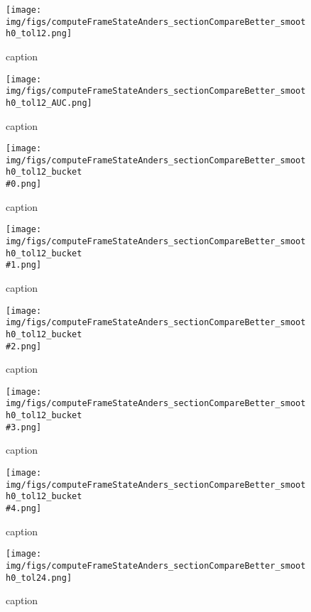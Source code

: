 %
\begin{figure}[!ht]
	\centering
	\texttt{[image: img/figs/computeFrameStateAnders\_sectionCompareBetter\_smooth0\_tol12.png]}
	\caption{caption}
	\label{fig:computeFrameStateAnders_sectionCompareBetter_smooth0_tol12.png}
\end{figure}
%
\begin{figure}[!ht]
	\centering
	\texttt{[image: img/figs/computeFrameStateAnders\_sectionCompareBetter\_smooth0\_tol12\_AUC.png]}
	\caption{caption}
	\label{fig:computeFrameStateAnders_sectionCompareBetter_smooth0_tol12_AUC.png}
\end{figure}
%
\begin{figure}[!ht]
	\centering
	\texttt{[image: img/figs/computeFrameStateAnders\_sectionCompareBetter\_smooth0\_tol12\_bucket\\\#0.png]}
	\caption{caption}
	\label{fig:computeFrameStateAnders_sectionCompareBetter_smooth0_tol12_bucket\#0.png}
\end{figure}
%
\begin{figure}[!ht]
	\centering
	\texttt{[image: img/figs/computeFrameStateAnders\_sectionCompareBetter\_smooth0\_tol12\_bucket\\\#1.png]}
	\caption{caption}
	\label{fig:computeFrameStateAnders_sectionCompareBetter_smooth0_tol12_bucket\#1.png}
\end{figure}
%
\begin{figure}[!ht]
	\centering
	\texttt{[image: img/figs/computeFrameStateAnders\_sectionCompareBetter\_smooth0\_tol12\_bucket\\\#2.png]}
	\caption{caption}
	\label{fig:computeFrameStateAnders_sectionCompareBetter_smooth0_tol12_bucket\#2.png}
\end{figure}
%
\begin{figure}[!ht]
	\centering
	\texttt{[image: img/figs/computeFrameStateAnders\_sectionCompareBetter\_smooth0\_tol12\_bucket\\\#3.png]}
	\caption{caption}
	\label{fig:computeFrameStateAnders_sectionCompareBetter_smooth0_tol12_bucket\#3.png}
\end{figure}
%
\begin{figure}[!ht]
	\centering
	\texttt{[image: img/figs/computeFrameStateAnders\_sectionCompareBetter\_smooth0\_tol12\_bucket\\\#4.png]}
	\caption{caption}
	\label{fig:computeFrameStateAnders_sectionCompareBetter_smooth0_tol12_bucket\#4.png}
\end{figure}
%
\begin{figure}[!ht]
	\centering
	\texttt{[image: img/figs/computeFrameStateAnders\_sectionCompareBetter\_smooth0\_tol24.png]}
	\caption{caption}
	\label{fig:computeFrameStateAnders_sectionCompareBetter_smooth0_tol24.png}
\end{figure}
